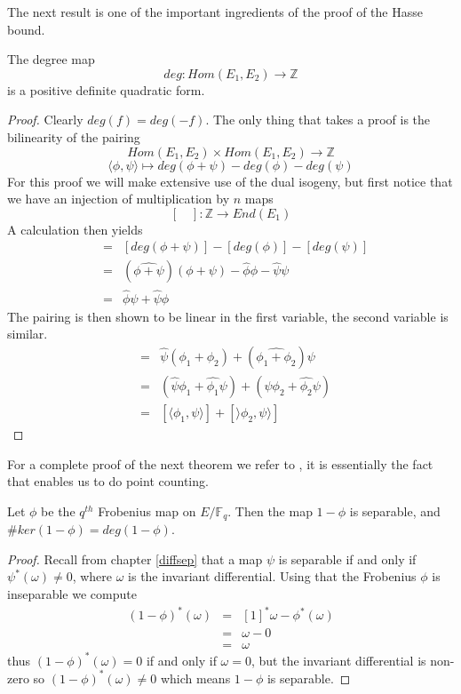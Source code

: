 The next result is one of the important ingredients of the proof of the Hasse bound.
\begin{prop}
 The degree map
$$ deg: Hom(E_1, E_2) \rightarrow \mathbb{Z} $$
is a positive definite quadratic form.
\end{prop}
\begin{proof}
 Clearly $deg(f) = deg(-f)$. The only thing that takes a proof is the
bilinearity of the pairing
$$ Hom(E_1, E_2) \times Hom(E_1, E_2) \rightarrow \mathbb{Z}$$
$$ \langle \phi, \psi \rangle \mapsto deg(\phi + \psi) - deg(\phi) - deg(\psi) $$
For this proof we will make extensive use of the dual isogeny, but first
notice that we have an injection of multiplication by $n$ maps
$$ [\quad]: \mathbb{Z} \rightarrow End(E_1) $$
A calculation then yields 
\begin{eqnarray*} 
 [\langle \phi,\psi \rangle] &=& [deg(\phi+\psi)]-[deg(\phi)]-[deg(\psi)] \nonumber \\
               &=& (\widehat{\phi+\psi})(\phi+\psi) - \widehat{\phi}\phi - \widehat{\psi}\psi \nonumber \\
	       &=& \widehat{\phi}\psi + \widehat{\psi}\phi
\end{eqnarray*}
The pairing is then shown to be linear in the first variable, the second variable is
similar.
\begin{eqnarray*}
 [\langle \phi_1+\phi_2, \psi \rangle] &=& \widehat{\psi}(\phi_1+\phi_2) + (\widehat{\phi_1+\phi_2})\psi \nonumber \\
			 &=& (\widehat{\psi}\phi_1+\widehat{\phi_1}\psi) + (\widehat{\psi}\phi_2 + \widehat{\phi_2}\psi) \nonumber \\
			 &=& [\langle \phi_1,\psi \rangle] + [\rangle \phi_2,\psi \rangle] 
\end{eqnarray*}
\end{proof}

For a complete proof of the next theorem we refer to \cite{AEC}, it is essentially the fact that enables
us to do point counting.

\begin{thm} \label{frobkernel}
 Let $\phi$ be the $q^{th}$ Frobenius map on $E/\mathbb{F}_q$. Then the map $1-\phi$ is separable, and
$\#ker(1-\phi) = deg(1-\phi)$.
\end{thm}
\begin{proof}
  Recall from chapter \ref{diffsep} that a map $\psi$ is separable if and only if $\psi^*(\omega) \neq 0$,
where $\omega$ is the invariant differential. Using that the Frobenius $\phi$ is inseparable \cite{AEC}
we compute
\begin{eqnarray}
 (1-\phi)^*(\omega) &=& [1]^*\omega - \phi^*(\omega) \nonumber \\
		    &=& \omega - 0 \nonumber \\
		    &=& \omega \nonumber
\end{eqnarray}
thus $(1-\phi)^*(\omega) = 0$ if and only if $\omega = 0$, but the invariant differential is non-zero
so $(1-\phi)^*(\omega) \neq 0$ which means $1-\phi$ is separable.
\end{proof}

